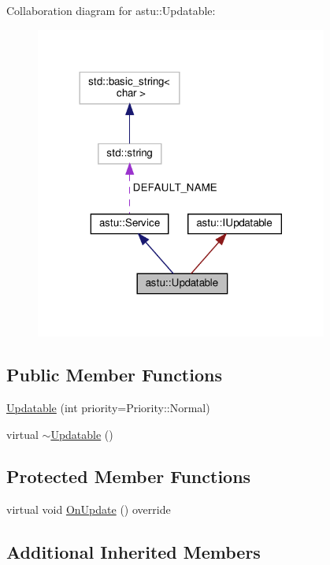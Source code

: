 Collaboration diagram for astu\+:\+:Updatable\+:\nopagebreak
\begin{figure}[H]
\begin{center}
\leavevmode
\includegraphics[width=272pt]{classastu_1_1Updatable__coll__graph}
\end{center}
\end{figure}
\subsection*{Public Member Functions}
\begin{DoxyCompactItemize}
\item 
\hyperlink{classastu_1_1Updatable_a5004b9bf883f7961762d0edc6b8329ba}{Updatable} (int priority=Priority\+::\+Normal)
\item 
virtual \hyperlink{classastu_1_1Updatable_a754466cfead86f94f366c32807eb118b}{$\sim$\+Updatable} ()
\end{DoxyCompactItemize}
\subsection*{Protected Member Functions}
\begin{DoxyCompactItemize}
\item 
virtual void \hyperlink{classastu_1_1Updatable_a925566c9770b95895c6c7294f9d51528}{On\+Update} () override
\end{DoxyCompactItemize}
\subsection*{Additional Inherited Members}


